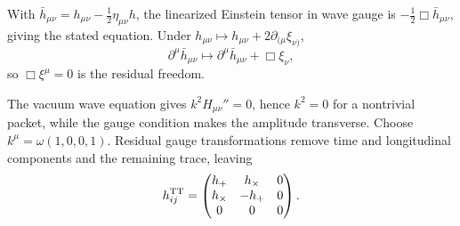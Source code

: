 \begin{solutions}
\begin{solution}
With
\(\bar h_{\mu\nu}=h_{\mu\nu}-\tfrac12\eta_{\mu\nu}h\), the linearized
Einstein tensor in wave gauge is
\(-\tfrac12\Box\bar h_{\mu\nu}\), giving the stated equation.  Under
\(h_{\mu\nu}\mapsto h_{\mu\nu}+2\partial_{(\mu}\xi_{\nu)}\),
\[
\partial^\mu\bar h_{\mu\nu}
\mapsto\partial^\mu\bar h_{\mu\nu}+\Box\xi_\nu,
\]
so \(\Box\xi^\mu=0\) is the residual freedom.

The vacuum wave equation gives \(k^2H_{\mu\nu}''=0\), hence \(k^2=0\) for a
nontrivial packet, while the gauge condition makes the amplitude transverse.
Choose \(k^\mu=\omega(1,0,0,1)\).  Residual gauge transformations remove
time and longitudinal components and the remaining trace, leaving
\[
h^{\rm TT}_{ij}
=\begin{pmatrix}
h_+&h_\times&0\\
h_\times&-h_+&0\\
0&0&0
\end{pmatrix}.
\]
\end{solution}



\end{solutions}
